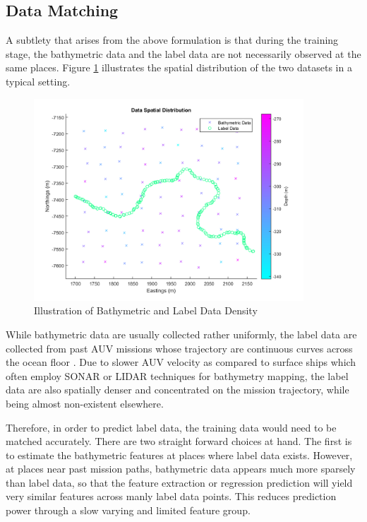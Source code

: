 		\FloatBarrier
		
		\subsection{Data Matching}
		\label{Background:OceanEnvironmentModeling:DataMatching}
		
			A subtlety that arises from the above formulation is that during the training stage, the bathymetric data and the label data are not necessarily observed at the same places. Figure \ref{Background:OceanEnvironmentModeling:Figure:illustrationBathymetricAgainstLabels} illustrates the spatial distribution of the two datasets in a typical setting.
		
			\begin{figure}[!htbp]
				\centering
					\includegraphics[width=0.9\textwidth]{Figures/illustrationBathymetricAgainstLabels.png}
				\caption{Illustration of Bathymetric and Label Data Density}
				\label{Background:OceanEnvironmentModeling:Figure:illustrationBathymetricAgainstLabels}
			\end{figure}
			
			While bathymetric data are usually collected rather uniformly, the label data are collected from past AUV missions whose trajectory are continuous curves across the ocean floor \citep{Squidle}. Due to slower AUV velocity as compared to surface ships which often employ SONAR or LIDAR techniques for bathymetry mapping, the label data are also spatially denser and concentrated on the mission trajectory, while being almost non-existent elsewhere.
			
			Therefore, in order to predict label data, the training data would need to be matched accurately. There are two straight forward choices at hand. The first is to estimate the bathymetric features at places where label data exists. However, at places near past mission paths, bathymetric data appears much more sparsely than label data, so that the feature extraction or regression prediction will yield very similar features across manly label data points. This reduces prediction power through a slow varying and limited feature group.
			

